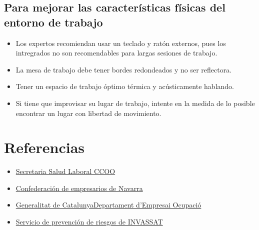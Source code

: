 \documentclass{article}
\begin{document}
      \subsection{Para mejorar las características físicas del entorno de trabajo}
        \begin{itemize}
          \item Los expertos recomiendan usar un teclado y ratón externos, pues los intregrados no son recomendables para largas sesiones de trabajo.
          \item La mesa de trabajo debe tener bordes redondeados y no ser reflectora.
          \item Tener un espacio de trabajo óptimo térmica y acústicamente hablando.
          \item Si tiene que improvisar su lugar de trabajo, intente en la medida de lo posible encontrar un lugar con libertad de movimiento.
        \end{itemize}
    
  \newpage
    \listoffigures
    \section{Referencias}
        \begin{itemize}
          \item \href{https://www.ccoo-servicios.es/archivos/unicaja/PRL_USO_PORTATILES.pdf}{Secretaria Salud Laboral CCOO}
          \item \href{http://www.cen7dias.es/contenido.php?bol=91&id=1913&sec=4}{Confederación de empresarios de Navarra}
          \item \href{https://www.unileon.es/intranet/prevencion/pvd_portatiles.pdf}{Generalitat de CatalunyaDepartament d’Empresai Ocupació}
          \item \href{http://prevencio.gva.es/documents/161660390/169792761/SPRL_DIPRL_12_00++Prevenci%C3%B3n+de+riesgos+laborales+durante+el+uso+del+ordenador+fuera+del+puesto+de+trabajo+habitual/33b7e144-ccaf-4f03-a8d7-b4af4cc2c584}{Servicio de prevención de riesgos de INVASSAT}
        \end{itemize}

    
\end{document}
